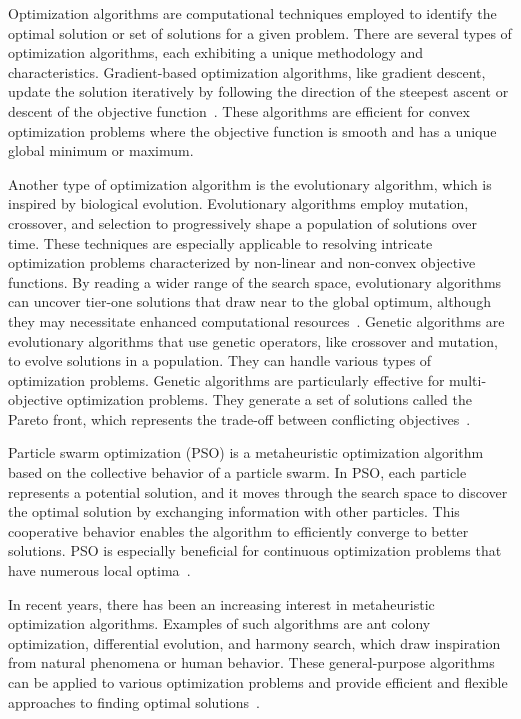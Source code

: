 Optimization algorithms are computational techniques employed to identify the optimal solution or set of solutions for a given problem. There are several types of optimization algorithms, each exhibiting a unique methodology and characteristics. Gradient-based optimization algorithms, like gradient descent, update the solution iteratively by following the direction of the steepest ascent or descent of the objective function~\cite{Ruder.2017}. These algorithms are efficient for convex optimization problems where the objective function is smooth and has a unique global minimum or maximum.

Another type of optimization algorithm is the evolutionary algorithm, which is inspired by biological evolution. Evolutionary algorithms employ mutation, crossover, and selection to progressively shape a population of solutions over time. These techniques are especially applicable to resolving intricate optimization problems characterized by non-linear and non-convex objective functions. By reading a wider range of the search space, evolutionary algorithms can uncover tier-one solutions that draw near to the global optimum, although they may necessitate enhanced computational resources~\cite{Back.1993}.
\newpage
Genetic algorithms are evolutionary algorithms that use genetic operators, like crossover and mutation, to evolve solutions in a population. They can handle various types of optimization problems. Genetic algorithms are particularly effective for multi-objective optimization problems. They generate a set of solutions called the Pareto front, which represents the trade-off between conflicting objectives~\cite{Lambora.2019,Katoch.2021}.

Particle swarm optimization (\acrshort{PSO}) is a metaheuristic optimization algorithm based on the collective behavior of a particle swarm. In \acrshort{PSO}, each particle represents a potential solution, and it moves through the search space to discover the optimal solution by exchanging information with other particles. This cooperative behavior enables the algorithm to efficiently converge to better solutions. \acrshort{PSO} is especially beneficial for continuous optimization problems that have numerous local optima~\cite{Back.1993}.

In recent years, there has been an increasing interest in metaheuristic optimization algorithms. Examples of such algorithms are ant colony optimization, differential evolution, and harmony search, which draw inspiration from natural phenomena or human behavior. These general-purpose algorithms can be applied to various optimization problems and provide efficient and flexible approaches to finding optimal solutions~\cite{Yang.2011}.

